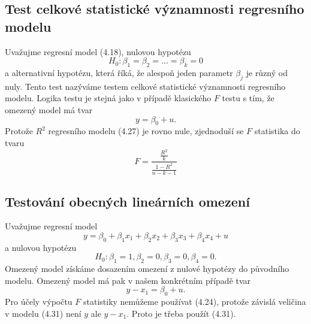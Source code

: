 \subsection{Test celkové statistické významnosti regresního modelu}

Uvažujme regresní model (4.18), nulovou hypotézu
\begin{equation}
H_0: \beta_1 = \beta_2 = ... = \beta_k = 0
\end{equation}
a alternativní hypotézu, která říká, že alespoň jeden parametr $\beta_j$ je různý od nuly. Tento test nazýváme testem celkové 
statistické významnosti regresního modelu. Logika testu je stejná jako v případě klasického $F$ testu s tím, že omezený model má tvar
\begin{equation}
y = \beta_0 + u.
\end{equation}
Protože $R^2$ regresního modelu (4.27) je rovno nule, zjednoduší se $F$ statistika do tvaru
\begin{equation}
F = \frac{\frac{R^2}{k}}{\frac{1 - R^2}{n - k - 1}}
\end{equation}

\subsection{Testování obecných lineárních omezení}

Uvažujme regresní model
\begin{equation}
y = \beta_0 + \beta_1 x_1 + \beta_2 x_2 + \beta_3 x_3 + \beta_4 x_4 + u
\end{equation}
a nulovou hypotézu
\begin{equation}
H_0: \beta_1 = 1, \beta_2 = 0, \beta_3 = 0, \beta_4 = 0.
\end{equation}
Omezený model získáme dosazením omezení z nulové hypotézy do původního modelu. Omezený model má pak v našem konkrétním případě tvar
\begin{equation}
y - x_1 = \beta_0 + u.
\end{equation}
Pro účely výpočtu $F$ statistiky nemůžeme používat (4.24), protože závislá veličina v modelu (4.31) není $y$ ale $y - x_1$. Proto je 
třeba použít (4.31).
